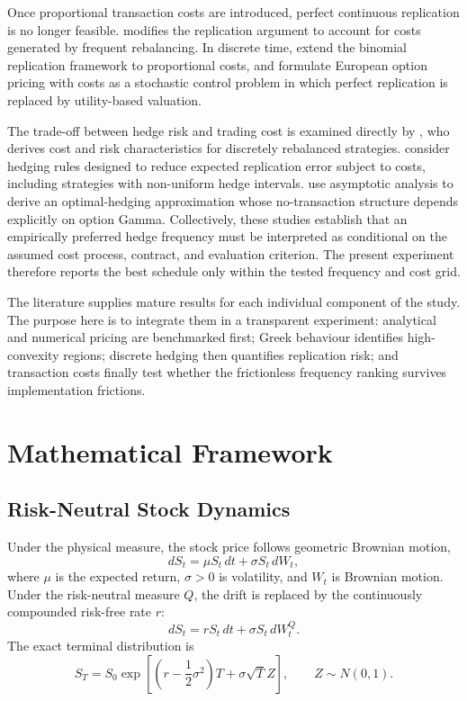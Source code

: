 \documentclass[11pt,a4paper]{article}
\begin{document}
Once proportional transaction costs are introduced, perfect continuous replication is no longer feasible. \citet{leland1985} modifies the replication argument to account for costs generated by frequent rebalancing. In discrete time, \citet{boylevorst1992} extend the binomial replication framework to proportional costs, and \citet{davispanaszariphopoulou1993} formulate European option pricing with costs as a stochastic control problem in which perfect replication is replaced by utility-based valuation.

The trade-off between hedge risk and trading cost is examined directly by \citet{toft1996}, who derives cost and risk characteristics for discretely rebalanced strategies. \citet{grannanswindle1996} consider hedging rules designed to reduce expected replication error subject to costs, including strategies with non-uniform hedge intervals. \citet{whalleywilmott1997} use asymptotic analysis to derive an optimal-hedging approximation whose no-transaction structure depends explicitly on option Gamma. Collectively, these studies establish that an empirically preferred hedge frequency must be interpreted as conditional on the assumed cost process, contract, and evaluation criterion. The present experiment therefore reports the best schedule only within the tested frequency and cost grid.

The literature supplies mature results for each individual component of the study. The purpose here is to integrate them in a transparent experiment: analytical and numerical pricing are benchmarked first; Greek behaviour identifies high-convexity regions; discrete hedging then quantifies replication risk; and transaction costs finally test whether the frictionless frequency ranking survives implementation frictions.

\section{Mathematical Framework}

\subsection{Risk-Neutral Stock Dynamics}

Under the physical measure, the stock price follows geometric Brownian motion,
\begin{equation}
    dS_t=\mu S_t\,dt+\sigma S_t\,dW_t,
\end{equation}
where $\mu$ is the expected return, $\sigma>0$ is volatility, and $W_t$ is Brownian motion. Under the risk-neutral measure $Q$, the drift is replaced by the continuously compounded risk-free rate $r$:
\begin{equation}
    dS_t=rS_t\,dt+\sigma S_t\,dW_t^Q.
\end{equation}
The exact terminal distribution is
\begin{equation}
    S_T=S_0\exp\left[\left(r-\frac{1}{2}\sigma^2\right)T+\sigma\sqrt{T}Z\right],
    \qquad Z\sim N(0,1).
\end{equation}
\end{document}
